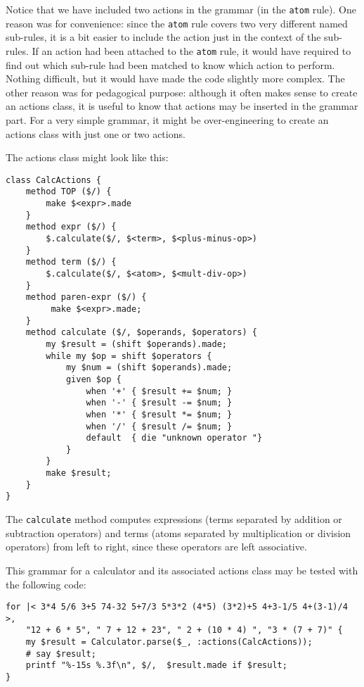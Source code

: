 Notice that we have included two actions in the grammar (in 
the {\tt atom} rule). One reason was for convenience: since 
the {\tt atom} rule covers two very different named 
sub-rules, it is a bit easier to include the action just 
in the context of the sub-rules. If an action had been attached 
to the  {\tt atom} rule, it would have required to find out 
which sub-rule had been matched to know which action to 
perform. Nothing difficult, but it would have made the  
code slightly more complex. The other reason was for pedagogical 
purpose: although it often makes sense to create an actions 
class, it is useful to know that actions may be inserted in the 
grammar part. For a very simple grammar, it might be 
over-engineering to create an actions class with just one or 
two actions.

The actions class might look like this:

\begin{verbatim}
class CalcActions {
    method TOP ($/) {
        make $<expr>.made
    }
    method expr ($/) {
        $.calculate($/, $<term>, $<plus-minus-op>)
    }
    method term ($/) {
        $.calculate($/, $<atom>, $<mult-div-op>)
    }
    method paren-expr ($/) {
         make $<expr>.made;
    }
    method calculate ($/, $operands, $operators) {
        my $result = (shift $operands).made;
        while my $op = shift $operators {
            my $num = (shift $operands).made;
            given $op {
                when '+' { $result += $num; }
                when '-' { $result -= $num; }
                when '*' { $result *= $num; }
                when '/' { $result /= $num; }
                default  { die "unknown operator "}
            }
        }
        make $result;
    }
}
\end{verbatim}

The {\tt calculate} method computes expressions (terms 
separated by addition or subtraction operators) and terms 
(atoms separated by multiplication or division operators) 
from left to right, since these operators are left associative.

This grammar for a calculator and its associated actions class 
may be tested with the following code:

\begin{verbatim}
for |< 3*4 5/6 3+5 74-32 5+7/3 5*3*2 (4*5) (3*2)+5 4+3-1/5 4+(3-1)/4 >,
    "12 + 6 * 5", " 7 + 12 + 23", " 2 + (10 * 4) ", "3 * (7 + 7)" { 
    my $result = Calculator.parse($_, :actions(CalcActions));
    # say $result;
    printf "%-15s %.3f\n", $/,  $result.made if $result;
}
\end{verbatim}

